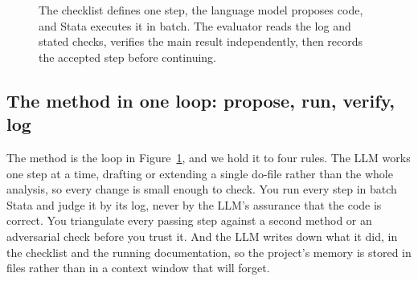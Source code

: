 \documentclass[
    a4paper,
    fontsize=10pt,
    twoside=true,
    numbers=noenddot,
]{kaobook}
\begin{document}
\begin{figure}[htbp]
\centering
{}
\caption[The checked proposal loop]{The checklist defines one step, the language model proposes code, and Stata executes it in batch. The evaluator reads the log and stated checks, verifies the main result independently, then records the accepted step before continuing.}
\label{fig:backbone}
\end{figure}

\subsection{The method in one loop: propose, run, verify, log}
The method is the loop in Figure~\ref{fig:backbone}, and we hold it to four rules. The LLM works one step at a time, drafting or extending a single do-file rather than the whole analysis, so every change is small enough to check. You run every step in batch Stata and judge it by its log, never by the LLM's assurance that the code is correct. You triangulate every passing step against a second method or an adversarial check before you trust it. And the LLM writes down what it did, in the checklist and the running documentation, so the project's memory is stored in files rather than in a context window that will forget.
\end{document}
